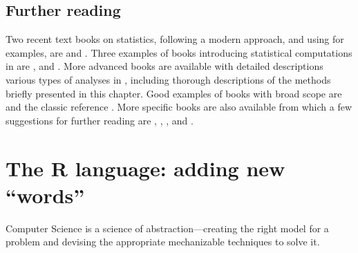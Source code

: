 \documentclass[krantz2]{krantz}\usepackage{knitr}
\begin{document}

%
%
%

\section{Further reading}\label{sec:stat:further:reading}

Two recent text books on statistics, following a modern approach, and using \Rlang for examples, are  \autocite{Diez2019} and  \autocite{Holmes2019}. Three examples of books introducing statistical computations in \Rlang are  \autocite{Dalgaard2008},  \autocite{Everitt2009} and  \autocite{Zuur2009}. More advanced books are available with detailed descriptions various types of analyses in \Rlang, including thorough descriptions of the methods briefly presented in this chapter. Good examples of books with broad scope are  \autocite{Crawley2012} and the classic reference  \autocite{Venables2002}. More specific books are also available from which a few suggestions for further reading are  \autocite{Everitt2011},  \autocite{Faraway2004},  \autocite{Faraway2006},  \autocite{Pinheiro2000} and  \autocite{Wood2017}.






\chapter{The R language: adding new ``words''}\label{chap:R:functions}

\begin{VF}
Computer Science is a science of abstraction---creating the right model for a problem and devising the appropriate mechanizable techniques to solve it.

\nocite{Aho1992}
\end{VF}
\end{document}
